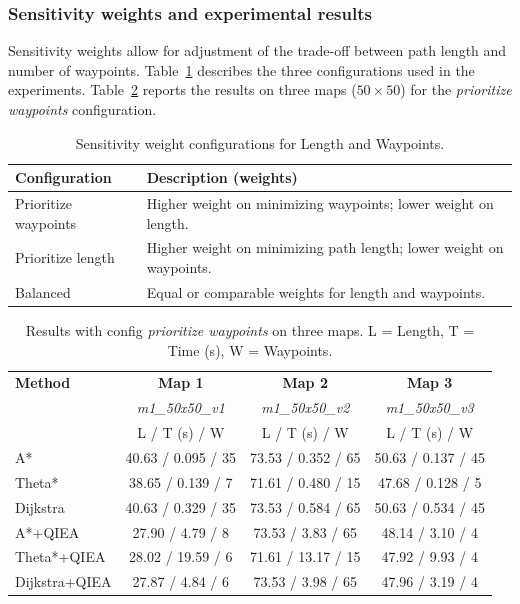 \subsubsection{Sensitivity weights and experimental results}

Sensitivity weights allow for adjustment of the trade-off between path length and number of waypoints. Table~\ref{tab:weights} describes the three configurations used in the experiments. Table~\ref{tab:waypoints} reports the results on three maps ($50\times50$) for the \emph{prioritize waypoints} configuration.

\begin{table}[htbp]
\centering
\small
\caption{\small Sensitivity weight configurations for Length and Waypoints.}
\label{tab:weights}
\begin{tabular}{l p{6cm}}
\hline
\textbf{Configuration} & \textbf{Description (weights)} \\
\hline
Prioritize waypoints & Higher weight on minimizing waypoints; lower weight on length. \\
Prioritize length & Higher weight on minimizing path length; lower weight on waypoints. \\
Balanced & Equal or comparable weights for length and waypoints. \\
\hline
\end{tabular}
\end{table}


\begin{table}[htbp]
\centering
\small
\renewcommand{\arraystretch}{1.2}
\caption{\small Results with config \emph{prioritize waypoints} on three maps. L = Length, T = Time (s), W = Waypoints.}
\label{tab:waypoints}
\begin{tabular}{l c c c}
\hline
\textbf{Method} & \textbf{Map 1} & \textbf{Map 2} & \textbf{Map 3} \\
& \textit{m1\_50x50\_v1} & \textit{m1\_50x50\_v2} & \textit{m1\_50x50\_v3} \\
& L / T (s) / W & L / T (s) / W & L / T (s) / W \\
\hline
A* & 40.63 / 0.095 / 35 & 73.53 / 0.352 / 65 & 50.63 / 0.137 / 45 \\
Theta* & 38.65 / 0.139 / 7 & 71.61 / 0.480 / 15 & 47.68 / 0.128 / 5 \\
Dijkstra & 40.63 / 0.329 / 35 & 73.53 / 0.584 / 65 & 50.63 / 0.534 / 45 \\
A*+QIEA & 27.90 / 4.79 / 8 & 73.53 / 3.83 / 65 & 48.14 / 3.10 / 4 \\
Theta*+QIEA & 28.02 / 19.59 / 6 & 71.61 / 13.17 / 15 & 47.92 / 9.93 / 4 \\
Dijkstra+QIEA & 27.87 / 4.84 / 6 & 73.53 / 3.98 / 65 & 47.96 / 3.19 / 4 \\
\hline
\end{tabular}
\end{table}


